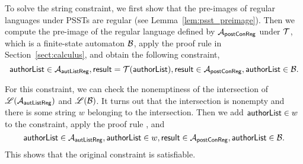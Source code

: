 To solve the string constraint, we first show that the pre-images of regular languages under PSSTs are regular (see Lemma~\ref{lem:psst_preimage}).
%
Then we compute the pre-image of the regular language defined by $\mathcal{A}_{\sf postConReg}$ under $\mathcal{T}$, which is a finite-state automaton $\mathcal{B}$, apply the proof rule {} in Section~\ref{sect:calculus}, and obtain the following constraint,
%
\[{\sf authorList} \in \mathcal{A}_{\sf autListReg}, {\sf result} = \mathcal{T}({\sf authorList}),  {\sf result} \in \mathcal{A}_{\sf postConReg}, {\sf authorList} \in \mathcal{B}.\]
%

For this constraint, we can check the nonemptiness of the intersection of $\mathscr{L}(\mathcal{A}_{\sf autListReg})$ and $\mathscr{L}(\mathcal{B})$. It turns out that the intersection is nonempty and there is some string $w$ belonging to the intersection. Then we add ${\sf authorList} \in w$ to the constraint, apply the proof rule {}, and  
%
\[{\sf authorList} \in \mathcal{A}_{\sf autListReg}, {\sf authorList} \in w,  {\sf result} \in \mathcal{A}_{\sf postConReg}, {\sf authorList} \in \mathcal{B}.\]
This shows that the original constraint is satisfiable.